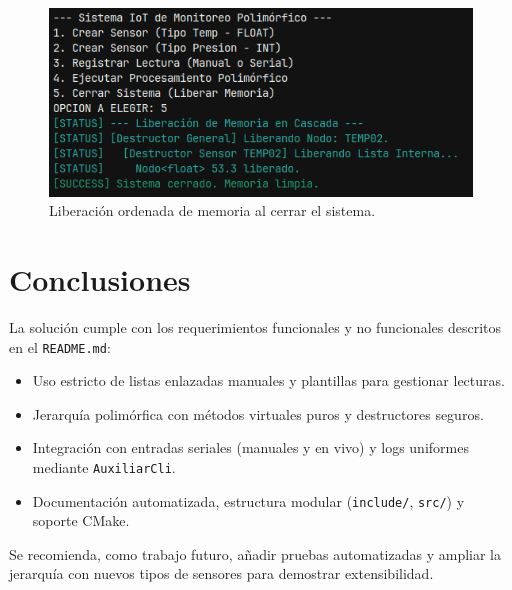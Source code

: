 \documentclass[11pt,a4paper]{article}
\begin{document}
\begin{figure}[h]
    \centering
    \includegraphics[width=0.8\linewidth]{salirDelPrograma.png}
    \caption{Liberación ordenada de memoria al cerrar el sistema.}
    \label{fig:salir}
\end{figure}

\clearpage

\section{Conclusiones}

La solución cumple con los requerimientos funcionales y no funcionales descritos en el \texttt{README.md}:
\begin{itemize}[leftmargin=1.5em]
    \item Uso estricto de listas enlazadas manuales y plantillas para gestionar lecturas.
    \item Jerarquía polimórfica con métodos virtuales puros y destructores seguros.
    \item Integración con entradas seriales (manuales y en vivo) y logs uniformes mediante \texttt{AuxiliarCli}.
    \item Documentación automatizada, estructura modular (\texttt{include/}, \texttt{src/}) y soporte CMake.
\end{itemize}

Se recomienda, como trabajo futuro, añadir pruebas automatizadas y ampliar la jerarquía con nuevos tipos de sensores para demostrar extensibilidad.
\end{document}
